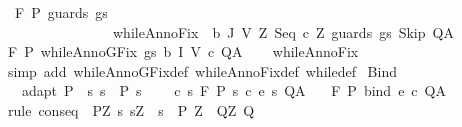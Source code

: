 \begin{isabellebody}
\ \ {\isachardoublequoteopen}{\isasymGamma}{\isacharcomma}{\isasymTheta}{\isasymturnstile}\isactrlbsub {\isacharslash}F\isactrlesub \ P\ {\isacharparenleft}guards\ gs\ \isanewline
\ \ \ \ \ \ \ \ \ \ \ \ \ \ \ \ {\isacharparenleft}whileAnnoFix\ \ b\ J\ V\ {\isacharparenleft}{\isasymlambda}Z{\isachardot}\ {\isacharparenleft}Seq\ {\isacharparenleft}c\ Z{\isacharparenright}\ {\isacharparenleft}guards\ gs\ Skip{\isacharparenright}{\isacharparenright}{\isacharparenright}{\isacharparenright}{\isacharparenright}\ Q{\isacharcomma}A{\isachardoublequoteclose}\isanewline
{}\ {\isachardoublequoteopen}{\isasymGamma}{\isacharcomma}{\isasymTheta}{\isasymturnstile}\isactrlbsub {\isacharslash}F\isactrlesub \ P\ {\isacharparenleft}whileAnnoGFix\ gs\ b\ I\ V\ c{\isacharparenright}\ Q{\isacharcomma}A{\isachardoublequoteclose}\isanewline
%
\isadelimproof
\ \ %
\endisadelimproof
%
\isatagproof
{}\isamarkupfalse%
\ whileAnnoFix\isanewline
\ \ \isamarkupfalse%
\ {\isacharparenleft}simp\ add{\isacharcolon}\ whileAnnoGFix{\isacharunderscore}def\ whileAnnoFix{\isacharunderscore}def\ while{\isacharunderscore}def{\isacharparenright}%
\endisatagproof
{\isafoldproof}%
%
\isadelimproof
\isanewline
%
\endisadelimproof
\isanewline
{}\isamarkupfalse%
\ Bind{\isacharcolon}\isanewline
\ \ \ adapt{\isacharcolon}\ {\isachardoublequoteopen}P\ {\isasymsubseteq}\ {\isacharbraceleft}s{\isachardot}\ s\ {\isasymin}\ P{\isacharprime}\ s{\isacharbraceright}{\isachardoublequoteclose}\ \isanewline
\ \ \ c{\isacharcolon}\ {\isachardoublequoteopen}{\isasymforall}s{\isachardot}\ {\isasymGamma}{\isacharcomma}{\isasymTheta}{\isasymturnstile}\isactrlbsub {\isacharslash}F\isactrlesub \ {\isacharparenleft}P{\isacharprime}\ s{\isacharparenright}\ {\isacharparenleft}c\ {\isacharparenleft}e\ s{\isacharparenright}{\isacharparenright}\ Q{\isacharcomma}A{\isachardoublequoteclose}\isanewline
\ \ \ {\isachardoublequoteopen}{\isasymGamma}{\isacharcomma}{\isasymTheta}{\isasymturnstile}\isactrlbsub {\isacharslash}F\isactrlesub \ P\ {\isacharparenleft}bind\ e\ c{\isacharparenright}\ Q{\isacharcomma}A{\isachardoublequoteclose}\ \isanewline
%
\isadelimproof
%
\endisadelimproof
%
\isatagproof
{}\isamarkupfalse%
\ {\isacharparenleft}rule\ conseq\ {\isacharbrackleft}\ P{\isacharprime}{\isacharequal}{\isachardoublequoteopen}{\isasymlambda}Z{\isachardot}\ {\isacharbraceleft}s{\isachardot}\ s{\isacharequal}Z\ {\isasymand}\ s\ {\isasymin}\ P{\isacharprime}\ Z{\isacharbraceright}{\isachardoublequoteclose}\ \ Q{\isacharprime}{\isacharequal}{\isachardoublequoteopen}{\isasymlambda}Z{\isachardot}\ Q{\isachardoublequoteclose}\ \ \isanewline

\end{isabellebody}

